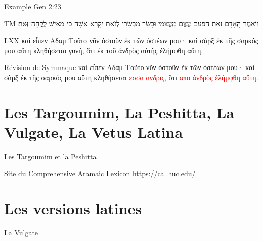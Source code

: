 \documentclass[11pt]{beamer}
\begin{document}
\begin{frame}{Example Gen 2:23}
\begin{block}{TM}
    \texthebrew{וַיֹּאמֶר הָֽאָדָם זֹאת הַפַּעַם עֶצֶם מֵֽעֲצָמַי וּבָשָׂר מִבְּשָׂרִי לְזֹאת יִקָּרֵא אִשָּׁה כִּי מֵאִישׁ לֻֽקֳחָה־זֹּֽאת׃}
\end{block}
\begin{block}{LXX}
    \textgreek{καὶ εἶπεν Αδαμ Τοῦτο νῦν ὀστοῦν ἐκ τῶν ὀστέων μου· καὶ σὰρξ ἐκ τῆς σαρκός μου αὕτη κληθήσεται γυνή, ὅτι ἐκ τοῦ ἀνδρὸς αὐτῆς ἐλήμφθη αὕτη.}
\end{block}
\begin{block}{Révision de Symmaque}
    \textgreek{καὶ εἶπεν Αδαμ Τοῦτο νῦν ὀστοῦν ἐκ τῶν ὀστέων μου· καὶ σὰρξ ἐκ τῆς σαρκός μου αὕτη κληθήσεται \textcolor{red}{εσσα ανδρις}, ὅτι \textcolor{red}{απο ἀνδρὸς ἐλήμφθη αὕτη}.}
\end{block}
    
\end{frame}



\section{Les Targoumim, La Peshitta, La Vulgate, La Vetus Latina}
\begin{frame}{Les Targoumim et la Peshitta}
\begin{block}{Site du Comprehensive Aramaic Lexicon}
    \href{https://cal.huc.edu/}{https://cal.huc.edu/}
\end{block}
\end{frame}

\section{Les versions latines}
\begin{frame}{La Vulgate}
\begin{block}{}
    \href{http://www.perseus.tufts.edu/hopper/text?doc=Perseus%3Atext%3A1999.02.0060%3Abook%3DGenesis%3Achapter%3D1%3Averse%3D1}{http://www.perseus.tufts.edu/}}}
\end{block}
\end{frame}
\end{document}
